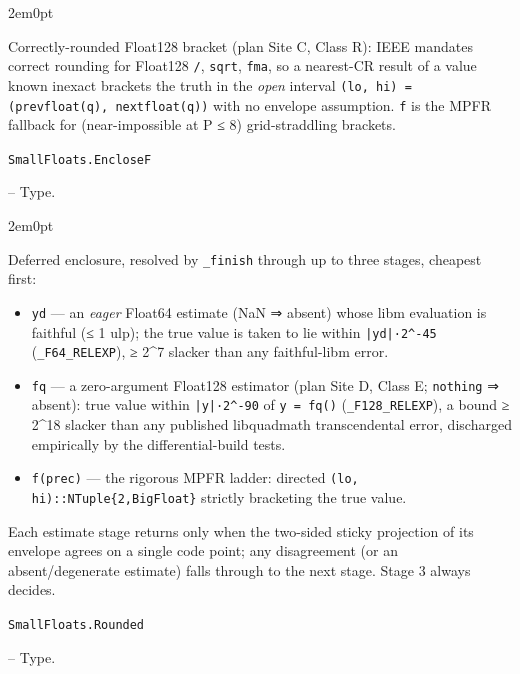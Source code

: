 \begin{adjustwidth}{2em}{0pt}

Correctly-rounded Float128 bracket (plan Site C, Class R): IEEE mandates correct rounding for Float128 \texttt{/}, \texttt{sqrt}, \texttt{fma}, so a nearest-CR result of a value known inexact brackets the truth in the \emph{open} interval \texttt{(lo, hi) = (prevfloat(q), nextfloat(q))} with no envelope assumption. \texttt{f} is the MPFR fallback for (near-impossible at P ≤ 8) grid-straddling brackets.



\end{adjustwidth}
\hypertarget{8610954342460218668}{\texttt{SmallFloats.EncloseF}}  -- {Type.}

\begin{adjustwidth}{2em}{0pt}

Deferred enclosure, resolved by \texttt{\_finish} through up to three stages, cheapest first:

\begin{itemize}
\item[1. ] \texttt{yd} — an \emph{eager} Float64 estimate (NaN ⇒ absent) whose libm evaluation is faithful (≤ 1 ulp); the true value is taken to lie within \texttt{|yd|·2{\textasciicircum}-45} (\texttt{\_F64\_RELEXP}), ≥ 2{\textasciicircum}7 slacker than any faithful-libm error.


\item[2. ] \texttt{fq} — a zero-argument Float128 estimator (plan Site D, Class E; \texttt{nothing} ⇒ absent): true value within \texttt{|y|·2{\textasciicircum}-90} of \texttt{y = fq()} (\texttt{\_F128\_RELEXP}), a bound ≥ 2{\textasciicircum}18 slacker than any published libquadmath transcendental error, discharged empirically by the differential-build tests.


\item[3. ] \texttt{f(prec)} — the rigorous MPFR ladder: directed \texttt{(lo, hi)::NTuple\{2,BigFloat\}} strictly bracketing the true value.

\end{itemize}
Each estimate stage returns only when the two-sided sticky projection of its envelope agrees on a single code point; any disagreement (or an absent/degenerate estimate) falls through to the next stage. Stage 3 always decides.



\end{adjustwidth}
\hypertarget{11170301116400441493}{\texttt{SmallFloats.Rounded}}  -- {Type.}

